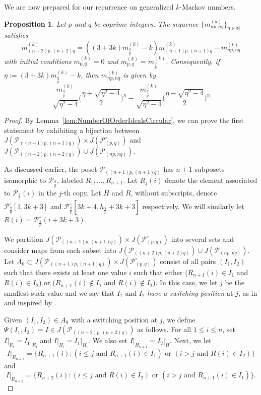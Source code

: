 \documentclass{article}
\newtheorem{prop}[theorem]{Proposition}
\theoremstyle{remark}
\newcommand{\fqp}{\frac{q}{p}}
\newcommand{\calP}{\mathcal{P}}
\begin{document}
We are now prepared for our recurrence on generalized $k$-Markov numbers. 

\begin{prop}\label{prop:RecurrenceAlongy=q/px}
 Let $p$ and $q$ be coprime integers.  The sequence $\{m^{(k)}_{np,nq}\}_{n \in \mathbb{N}}$ satisfies \[
m^{(k)}_{(n+2)p,(n+2)q} = ((3+3k)m^{(k)}_\fqp - k)m^{(k)}_{(n+1)p,(n+1)q} - m^{(k)}_{np,nq}
 \]
 with initial conditions $m^{(k)}_{0,0} = 0$ and $m^{(k)}_{p,q} = m^{(k)}_\fqp$. Consequently, if $\eta:= (3 + 3k)m^{(k)}_\fqp -k$, then
 $m^{(k)}_{np,nq}$ is given by \[
\frac{m^{(k)}_\fqp}{\sqrt{\eta^2 - 4}}\bigg(\frac{\eta + \sqrt{\eta^2 - 4}}{2}\bigg)^n - \frac{m_\fqp^{(k)}}{\sqrt{\eta^2 - 4}}\bigg(\frac{\eta - \sqrt{\eta^2 - 4}}{2}\bigg)^n 
 \]   
\end{prop}

\begin{proof}
By Lemma~\ref{lem:NumberOfOrderIdealsCircular}, we can prove the first statement by exhibiting a bijection between $J(\calP_{((n+1)p,(n+1)q)}) \times J(\calP^\circ_{(p,q)})$ and $J(\calP_{((n+2)p,(n+2)q)}) \cup J(\calP_{(np,nq)})$.

As discussed earlier, the poset $\calP_{((n+1)p,(n+1)q)}$ has $n+1$ subposets isomorphic to $\calP_{\fqp}$, labeled $R_1,\ldots,R_{n+1}$. Let $R_j(i)$ denote the element associated to $\calP_{\fqp}(i)$ in the $j$-th copy.  Let $H$ and $R$, without subscripts, denote $\calP^\circ_{\fqp}[1,3k+3]$ and $\calP^\circ_{\fqp}[3k+4,  h_{\fqp}+3k+3]$ respectively. We will similarly let $R(i) = \calP^\circ_{\fqp}(i + 3k + 3)$. 

We partition $J(\calP_{((n+1)p,(n+1)q)}) \times J(\calP^\circ_{(p,q)})$ into several sets and consider maps from each subset into $J(\calP_{((n+2)p,(n+2)q)}) \cup J(\calP_{(np,nq)})$. Let $A_0 \subset J(\calP_{((n+1)p,(n+1)q)}) \times J(\calP^\circ_{(p,q)})$ consist of all pairs $(I_1,I_2)$ such that there exists at least one value $i$ such that either ($R_{n+1}(i) \in I_1$ and $R(i) \in I_2$) or ($R_{n+1}(i) \notin I_1$ and $R(i) \notin I_2$). In this case, we let $j$ be the smallest such value and we say that $I_1$ and $I_2$ \emph{have a switching position} at $j$, as in \cite{banaian2024skein} and inspired by \cite{CS13}. 

Given $(I_1,I_2) \in A_0$ with a switching position at $j$, we define $\Psi(I_1,I_2) = I \in J(\calP_{((n+2)p,(n+2)q)})$ as follows. For all $1 \leq i \leq n$, set $I\vert_{R_i} = I_1 \vert_{R_i}$ and $I \vert_{H_i} = I_1 \vert_{H_i}$. We also set $I \vert_{H_{n+1}} = I_2 \vert_H$. Next, we let \[
I\vert_{R_{n+1}}= \{R_{n+1}(i) : (i \leq j \text{ and } R_{n+1}(i) \in I_1) \text{ or } (i > j \text{ and } R(i) \in I_2) \}
\]
and 
\[
I\vert_{R_{n+2}}= \{R_{n+2}(i) : (i \leq j \text{ and } R(i) \in I_2) \text{ or } (i > j \text{ and } R_{n+1}(i) \in I_1) \}.
\]


\end{proof}
\end{document}
